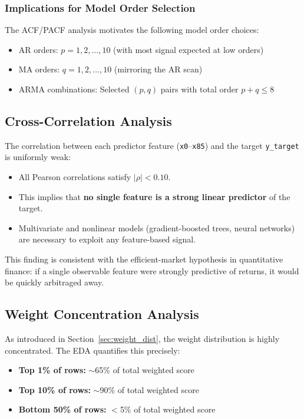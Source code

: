 \subsubsection{Implications for Model Order Selection}

The ACF/PACF analysis motivates the following model order choices:
\begin{itemize}
    \item AR orders: $p = 1, 2, \ldots, 10$ (with most signal expected at low orders)
    \item MA orders: $q = 1, 2, \ldots, 10$ (mirroring the AR scan)
    \item ARMA combinations: Selected $(p, q)$ pairs with total order $p + q \leq 8$
\end{itemize}

\subsection{Cross-Correlation Analysis}

The correlation between each predictor feature (\texttt{x0}--\texttt{x85}) and the target \texttt{y\_target} is uniformly weak:

\begin{itemize}
    \item All Pearson correlations satisfy $|\rho| < 0.10$.
    \item This implies that \textbf{no single feature is a strong linear predictor} of the target.
    \item Multivariate and nonlinear models (gradient-boosted trees, neural networks) are necessary to exploit any feature-based signal.
\end{itemize}

This finding is consistent with the efficient-market hypothesis in quantitative finance: if a single observable feature were strongly predictive of returns, it would be quickly arbitraged away.

\subsection{Weight Concentration Analysis}

As introduced in Section~\ref{sec:weight_dist}, the weight distribution is highly concentrated. The EDA quantifies this precisely:

\begin{itemize}
    \item \textbf{Top 1\% of rows:} $\sim$65\% of total weighted score
    \item \textbf{Top 10\% of rows:} $\sim$90\% of total weighted score
    \item \textbf{Bottom 50\% of rows:} $<$5\% of total weighted score
\end{itemize}

